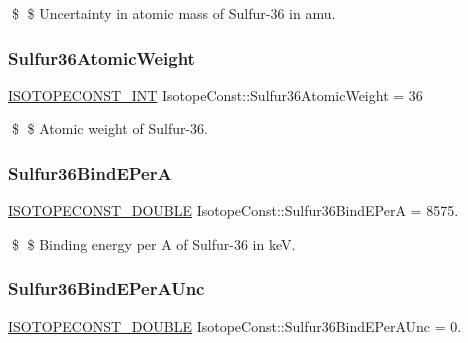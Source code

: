 \$ \$ Uncertainty in atomic mass of Sulfur-\/36 in amu. \mbox{\label{group___isotope_const-_sulfur-_s36_gadbbe10b21abdf245e05c2d438a2e61ce}} 
\subsubsection{\texorpdfstring{Sulfur36\+Atomic\+Weight}{Sulfur36AtomicWeight}}
{\footnotesize\ttfamily \mbox{\hyperlink{group___isotope_const-_macros_ga5f18360b3e99483a35c32d789e62621c}{I\+S\+O\+T\+O\+P\+E\+C\+O\+N\+S\+T\+\_\+\+I\+NT}} Isotope\+Const\+::\+Sulfur36\+Atomic\+Weight = 36}

\$ \$ Atomic weight of Sulfur-\/36. \mbox{\label{group___isotope_const-_sulfur-_s36_ga9d090133525a48cac125f0669b363554}} 
\subsubsection{\texorpdfstring{Sulfur36\+Bind\+E\+PerA}{Sulfur36BindEPerA}}
{\footnotesize\ttfamily \mbox{\hyperlink{group___isotope_const-_macros_ga8f45a7272ce02c0b4c65c44636ed719a}{I\+S\+O\+T\+O\+P\+E\+C\+O\+N\+S\+T\+\_\+\+D\+O\+U\+B\+LE}} Isotope\+Const\+::\+Sulfur36\+Bind\+E\+PerA = 8575.}

\$ \$ Binding energy per A of Sulfur-\/36 in keV. \mbox{\label{group___isotope_const-_sulfur-_s36_ga37d54f62595aabbdd0220510b72c5e04}} 
\subsubsection{\texorpdfstring{Sulfur36\+Bind\+E\+Per\+A\+Unc}{Sulfur36BindEPerAUnc}}
{\footnotesize\ttfamily \mbox{\hyperlink{group___isotope_const-_macros_ga8f45a7272ce02c0b4c65c44636ed719a}{I\+S\+O\+T\+O\+P\+E\+C\+O\+N\+S\+T\+\_\+\+D\+O\+U\+B\+LE}} Isotope\+Const\+::\+Sulfur36\+Bind\+E\+Per\+A\+Unc = 0.}

